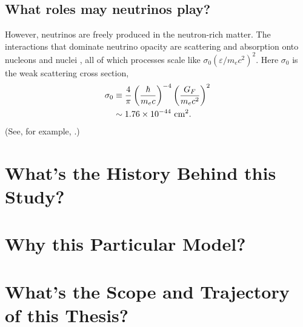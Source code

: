\subsection{What roles may neutrinos play?}


However, neutrinos are freely produced in the neutron-rich matter. The
interactions that dominate neutrino opacity are scattering and absorption onto
nucleons and nuclei \citep[Sec.\ 11.7]{shap1983-bh_wd_ns}, all of which processes
scale like $\sigma_0(\varepsilon/m_e c^2)^2$. Here $\sigma_0$ is the weak
scattering cross section,
\begin{align}
  \sigma_0
  &\equiv \frac{4}{\pi}\left(\frac{\hbar}{m_e c}\right)^{-4}
  \left(\frac{G_F}{m_e c^2}\right)^2 \\
  &\sim   1.76 \times 10^{-44} \,\, {\rm cm}^2.
\end{align}
(See, for example, \citealt{tubb1975-neutrino_opacities}.)

\section{What's the History Behind this Study?}

\section{Why this Particular Model?}

\section{What's the Scope and Trajectory of this Thesis?}
